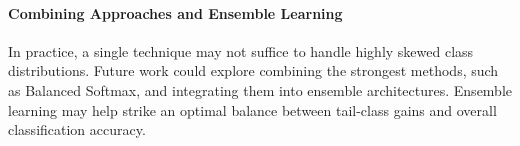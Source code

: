 \paragraph{Combining Approaches and Ensemble Learning}
In practice, a single technique may not suffice to handle highly skewed class distributions. Future work could explore combining the strongest methods, such as Balanced Softmax, and integrating them into ensemble architectures. Ensemble learning may help strike an optimal balance between tail-class gains and overall classification accuracy.




